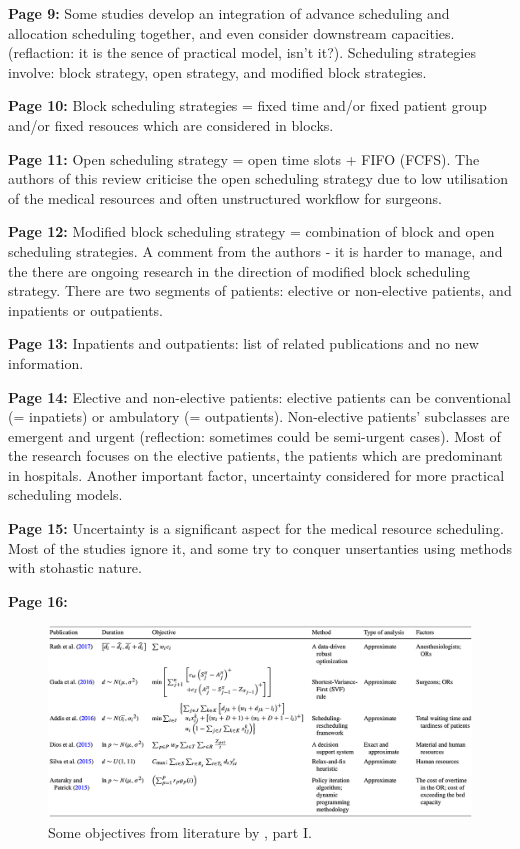     \textbf{Page 9:}
    Some studies develop an integration of advance scheduling and allocation scheduling together, and even consider downstream capacities. (reflaction: it is the sence of practical model, isn't it?). Scheduling strategies involve: block strategy, open strategy, and modified block strategies.

    \textbf{Page 10:}
    Block scheduling strategies = fixed time and/or fixed patient group and/or fixed resouces which are considered in blocks.

    \textbf{Page 11:}
    Open scheduling strategy = open time slots + FIFO (FCFS). The authors of this review criticise the open scheduling strategy due to low utilisation of the medical resources and often unstructured workflow for surgeons.
    
    \textbf{Page 12:}
    Modified block scheduling strategy = combination of block and open scheduling strategies. A comment from the authors - it is harder to manage, and the there are ongoing research in the direction of modified block scheduling strategy. There are two segments of patients: elective or non-elective patients, and inpatients or outpatients. 

    \textbf{Page 13:}
    Inpatients and outpatients: list of related publications and no new information.
    
    \textbf{Page 14:}
    Elective and non-elective patients: elective patients can be conventional (= inpatiets) or ambulatory (= outpatients). Non-elective patients' subclasses are emergent and urgent (reflection: sometimes could be semi-urgent cases). Most of the research focuses on the elective patients, the patients which are predominant in hospitals. Another important factor, uncertainty considered for more practical scheduling models.
    
    \textbf{Page 15:}
    Uncertainty is a significant aspect for the medical resource scheduling. Most of the studies ignore it, and some try to conquer unsertanties using methods with stohastic nature.
    
    \textbf{Page 16:}
    \begin{figure}[H]
        \centering
        \includegraphics[width=1\textwidth]{figures/SR0013CN19/fig3.png}
        \caption{Some objectives from literature by \cite{x203}, part I.}
        \label{fig3:SR0013CN19}
    \end{figure}
    

